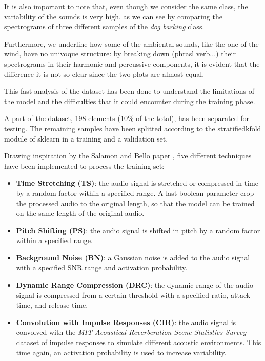 \documentclass{article}
\begin{document}
\begin{sloppy}
It is also important to note that, even though we consider the same class, the variability of the sounds is very high, as we can see by comparing the spectrograms of three different
samples of the \textit{dog barking} class.

Furthermore, we underline how some of the ambiental sounds, like the one of the wind, have no univoque structure: by breaking down (phrasl verb...)
their spectrograms in their harmonic and percussive components, it is evident that the difference it is not so clear since the two plots are almost equal.

This fast analysis of the dataset has been done to understand the limitations of the model and the difficulties that it could encounter during the training phase.

A part of the dataset, 198 elements (10\% of the total), has been separated for testing. The remaining samples have been splitted according to the stratifiedkfold module of sklearn \cite{scikit-learn_stratifiedkfold} in a training and a validation set.

Drawing inspiration by the Salamon and Bello paper \cite{salamon2017deep}, five different techniques have been implemented to process the training set:
\begin{itemize}
    \item \textbf{Time Stretching (TS)}: the audio signal is stretched or compressed in time by a random factor within a specified range. A last boolean parameter crop the processed audio to the original length, so that the model can be trained on the same length of the original audio.
    \item \textbf{Pitch Shifting (PS)}: the audio signal is shifted in pitch by a random factor within a specified range.
    \item \textbf{Background Noise (BN)}: a Gaussian noise is added to the audio signal with a specified SNR range and activation probability.
    \item \textbf{Dynamic Range Compression (DRC)}: the dynamic range of the audio signal is compressed from a certain threshold with a specified ratio, attack time, and release time.
    \item \textbf{Convolution with Impulse Responses (CIR)}: the audio signal is convolved with the \textit{MIT Acoustical Reverberation Scene Statistics Survey} dataset of impulse responses\cite{traer2016statistics} to simulate different acoustic environments. This time again, an activation probability is used to increase variability.
\end{itemize}


\end{sloppy}
\end{document}
